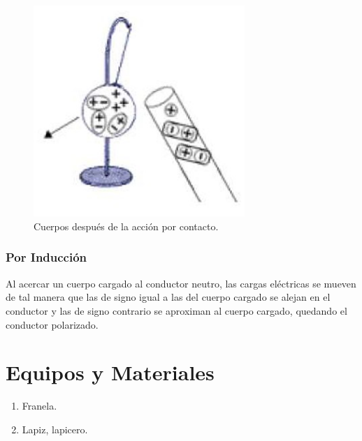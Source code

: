 \begin{figure}[H]
	\centering
	\includegraphics[width=8cm]{Images/img3.jpg}
	\caption{Cuerpos después de la acción por contacto.}\label{Fig:fg3}
\end{figure}
\subsubsection{Por Inducción}
Al acercar un cuerpo cargado al conductor neutro, las cargas eléctricas se
mueven de tal manera que las de signo igual a las del cuerpo cargado se alejan
en el conductor y las de signo contrario se aproximan al cuerpo cargado,
quedando el conductor polarizado.
\section{Equipos y Materiales}
\begin{enumerate}[label=\itemcirccz{azzul}{\alph*},itemsep=2pt,partopsep=6pt]
	\item Franela.
	\item Lapiz, lapicero.
\end{enumerate}



